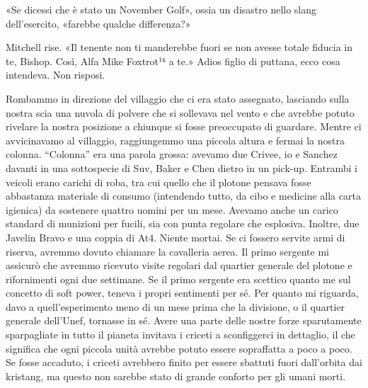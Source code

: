 «Se dicessi che è stato un November Golf», ossia un disastro nello slang
dell'esercito, «farebbe qualche differenza?»

Mitchell rise. «Il tenente non ti manderebbe fuori se non avesse totale
fiducia in te, Bishop. Così, Alfa Mike Foxtrot¹⁶ a te.» Adios figlio di
puttana, ecco cosa intendeva. Non risposi.

\hfill\break

Rombammo in direzione del villaggio che ci era stato assegnato,
lasciando sulla nostra scia una nuvola di polvere che si sollevava nel
vento e che avrebbe potuto rivelare la nostra posizione a chiunque si
fosse preoccupato di guardare. Mentre ci avvicinavamo al villaggio,
raggiungemmo una piccola altura e fermai la nostra colonna. ``Colonna''
era una parola grossa: avevamo due Crivee, io e Sanchez davanti in una
sottospecie di Suv, Baker e Chen dietro in un pick-up. Entrambi i
veicoli erano carichi di roba, tra cui quello che il plotone pensava
fosse abbastanza materiale di consumo (intendendo tutto, da cibo e
medicine alla carta igienica) da sostenere quattro uomini per un mese.
Avevamo anche un carico standard di munizioni per fucili, sia con punta
regolare che esplosiva. Inoltre, due Javelin Bravo e una coppia di At4.
Niente mortai. Se ci fossero servite armi di riserva, avremmo dovuto
chiamare la cavalleria aerea. Il primo sergente mi assicurò che avremmo
ricevuto visite regolari dal quartier generale del plotone e
rifornimenti ogni due settimane. Se il primo sergente era scettico
quanto me sul concetto di soft power, teneva i propri sentimenti per sé.
Per quanto mi riguarda, davo a quell'esperimento meno di un mese prima
che la divisione, o il quartier generale dell'Unef, tornasse in sé.
Avere una parte delle nostre forze sparutamente sparpagliate in tutto il
pianeta invitava i criceti a sconfiggerci in dettaglio, il che significa
che ogni piccola unità avrebbe potuto essere sopraffatta a poco a poco.
Se fosse accaduto, i criceti avrebbero finito per essere sbattuti fuori
dall'orbita dai kristang, ma questo non sarebbe stato di grande conforto
per gli umani morti.

